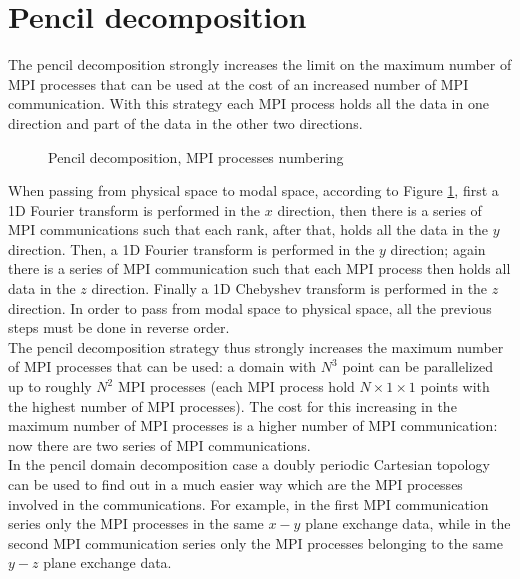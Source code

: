 \section{Pencil decomposition}
\label{sec: pencil}
The pencil decomposition strongly increases the limit on the maximum number of MPI processes that can be used at the cost of an increased number of MPI communication. With this strategy each MPI process holds all the data in one direction and part of the data in the other two directions.
\begin{figure}[h!]
\centering
\begin{subfigure}{0.45\textwidth}

\end{subfigure}%
\hspace{0.5cm}
\begin{subfigure}{0.45\textwidth}

\end{subfigure}
\caption{Pencil decomposition, MPI processes numbering}
\label{fig: pencil}
\end{figure}
When passing from physical space to modal space, according to Figure \ref{fig: pencil}, first a 1D Fourier transform is performed in the $x$ direction, then there is a series of MPI communications such that each rank, after that, holds all the data in the $y$ direction. Then, a 1D Fourier transform is performed in the $y$ direction; again there is a series of MPI communication such that each MPI process then holds all data in the $z$ direction. Finally a 1D Chebyshev transform is performed in the $z$ direction. In order to pass from modal space to physical space, all the previous steps must be done in reverse order.\\
The pencil decomposition strategy thus strongly increases the maximum number of MPI processes that can be used: a domain with $N^3$ point can be parallelized up to roughly $N^2$ MPI processes (each MPI process hold $N\times1\times1$ points with the highest number of MPI processes). The cost for this increasing in the maximum number of MPI processes is a higher number of MPI communication: now there are two series of MPI communications.\\
In the pencil domain decomposition case a doubly periodic Cartesian topology can be used to find out in a much easier way which are the MPI processes involved in the communications. For example, in the first MPI communication series only the MPI processes in the same $x-y$ plane exchange data, while in the second MPI communication series only the MPI processes belonging to the same $y-z$ plane exchange data.


